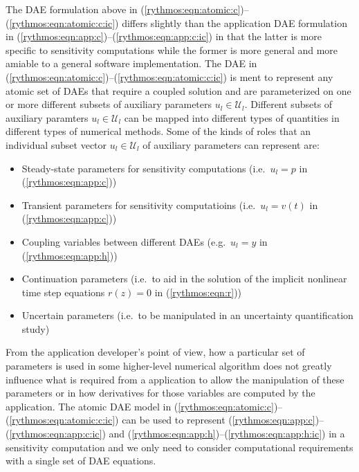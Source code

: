 \documentclass[pdf,ps2pdf,11pt]{SANDreport}
\begin{document}
The DAE formulation above in
(\ref{rythmos:eqn:atomic:c})--(\ref{rythmos:eqn:atomic:c:ic}) differs slightly
than the application DAE formulation in
(\ref{rythmos:eqn:app:c})--(\ref{rythmos:eqn:app:c:ic}) in that the latter is
more specific to sensitivity computations while the former is more general and
more amiable to a general software implementation.  The DAE in
(\ref{rythmos:eqn:atomic:c})--(\ref{rythmos:eqn:atomic:c:ic}) is ment to
represent any atomic set of DAEs that require a coupled solution and are
parameterized on one or more different subsets of auxiliary parameters
$u_l\in\mathcal{U}_l$.  Different subsets of auxiliary paramters
$u_l\in\mathcal{U}_l$ can be mapped into different types of quantities in
different types of numerical methods.  Some of the kinds of roles that an
individual subset vector $u_l\in\mathcal{U}_l$ of auxiliary parameters can
represent are:
%
\begin{itemize}
%
{}\item Steady-state parameters for sensitivity computations (i.e.\ $u_l =
p$ in (\ref{rythmos:eqn:app:c}))
%
{}\item Transient parameters for sensitivity computatioins (i.e.\ $u_l = v(t)$
in (\ref{rythmos:eqn:app:c}))
%
{}\item Coupling variables between different DAEs (e.g.\ $u_l = y$ in
(\ref{rythmos:eqn:app:h}))
%
{}\item Continuation parameters (i.e.\ to aid in the solution of the implicit
nonlinear time step equations $r(z)=0$ in (\ref{rythmos:eqn:r}))
%
{}\item Uncertain parameters (i.e.\ to be manipulated in an uncertainty
quantification study)
%
\end{itemize}

From the application developer's point of view, how a particular set of
parameters is used in some higher-level numerical algorithm does not greatly
influence what is required from a application to allow the manipulation of
these parameters or in how derivatives for those variables are computed by the
application.  The atomic DAE model in
(\ref{rythmos:eqn:atomic:c})--(\ref{rythmos:eqn:atomic:c:ic}) can be used to
represent (\ref{rythmos:eqn:app:c})--(\ref{rythmos:eqn:app:c:ic}) and
(\ref{rythmos:eqn:app:h})--(\ref{rythmos:eqn:app:h:ic}) in a sensitivity
computation and we only need to consider computational requirements with a
single set of DAE equations.
\end{document}
